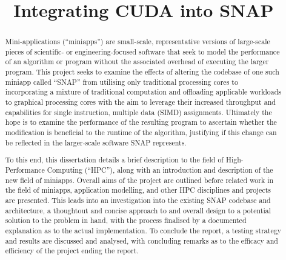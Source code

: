 \documentclass[conference]{IEEEtran}
\begin{document}
\title{Integrating CUDA into SNAP}


\author{
}


\maketitle


\begin{abstract}

Mini-applications (``miniapps'') are small-scale, representative versions of large-scale pieces of scientific- or engineering-focused software that seek to model the performance of an algorithm or program without the associated overhead of executing the larger program. This project seeks to examine the effects of altering the codebase of one such miniapp called ``SNAP'' from utilising only traditional processing cores to incorporating a mixture of traditional computation and offloading applicable workloads to graphical processing cores with the aim to leverage their increased throughput and capabilities for single instruction, multiple data (SIMD) assignments. Ultimately the hope is to examine the performance of the resulting program to ascertain whether the modification is beneficial to the runtime of the algorithm, justifying if this change can be reflected in the larger-scale software SNAP represents.

To this end, this dissertation details a brief description to the field of High-Performance Computing (``HPC''), along with an introduction and description of the new field of miniapps. Overall aims of the project are outlined before related work in the field of miniapps, application modelling, and other HPC disciplines and projects are presented. This leads into an investigation into the existing SNAP codebase and architecture, a thoughtout and concise approach to and overall design to a potential solution to the problem in hand, with the process finalised by a documented explanation as to the actual implementation. To conclude the report, a testing strategy and results are discussed and analysed, with concluding remarks as to the efficacy and efficiency of the project ending the report.

\end{abstract}

\end{document}
